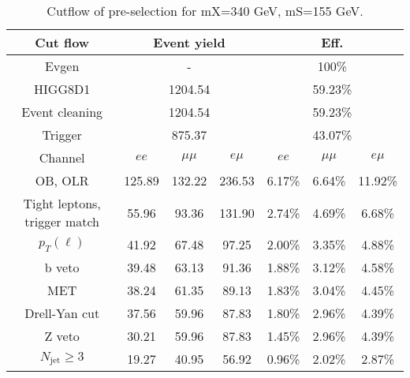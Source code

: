 \begin{table}
\centering\small
\begin{tabular}{c|ccc|ccc}
\hline
\hline
Cut flow &\multicolumn{3}{c|}{Event yield}&\multicolumn{3}{c}{Eff.}      \\
\hline
Evgen&\multicolumn{3}{c|}{-}&\multicolumn{3}{c}{100\%}\\
HIGG8D1&\multicolumn{3}{c|}{1204.54}&\multicolumn{3}{c}{59.23\%}\\
Event cleaning&\multicolumn{3}{c|}{1204.54}&\multicolumn{3}{c}{59.23\%}\\
Trigger&\multicolumn{3}{c|}{875.37    }&\multicolumn{3}{c}{43.07\%}\\
Channel&$ee$&$\mu\mu$&$e\mu$&$ee$&$\mu\mu$&$e\mu$\\
\hline
OB, OLR    &125.89    &132.22    &236.53& 6.17\%    &6.64\%    &11.92\%\\
Tight leptons, trigger match    &55.96    &93.36    &131.90    &2.74\%    &4.69\%    &6.68\%\\
$p_T(\ell)$    &41.92    &67.48    &97.25    &2.00\%    &3.35\%    &4.88\%\\
b veto    &39.48    &63.13    &91.36    &1.88\%    &3.12\%    &4.58\%\\
MET    &38.24    &61.35    &89.13    &1.83\%    &3.04\%    &4.45\%\\
Drell-Yan cut    &37.56    &59.96    &87.83    &1.80\%    &2.96\%    &4.39\%\\
Z veto    &30.21    &59.96    &87.83    &1.45\%    &2.96\%    &4.39\%\\
$N_{\text{jet}}\geq3$    &19.27    &40.95    &56.92    &0.96\%    &2.02\%    &2.87\%\\
\hline
\hline
\end{tabular}
\caption{Cutflow of pre-selection for mX=340 GeV, mS=155 GeV.}
\label{tab:cut_flow_preselection_mX260}
\end{table}
